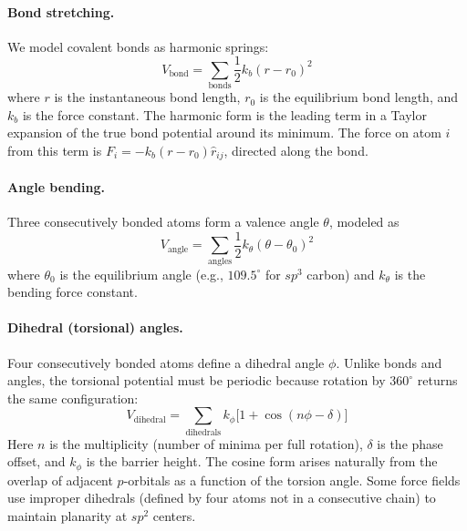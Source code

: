 \paragraph{Bond stretching.} We model covalent bonds as harmonic springs:
\begin{equation}
\label{eq:bond}
V_{\text{bond}} = \sum_{\text{bonds}} \frac{1}{2} k_b (r - r_0)^2
\end{equation}
where $r$ is the instantaneous bond length, $r_0$ is the equilibrium bond length, and $k_b$ is the force constant. The harmonic form is the leading term in a Taylor expansion of the true bond potential around its minimum. The force on atom $i$ from this term is $F_i = -k_b(r - r_0) \hat{r}_{ij}$, directed along the bond.

\paragraph{Angle bending.} Three consecutively bonded atoms form a valence angle $\theta$, modeled as
\begin{equation}
\label{eq:angle}
V_{\text{angle}} = \sum_{\text{angles}} \frac{1}{2} k_\theta (\theta - \theta_0)^2
\end{equation}
where $\theta_0$ is the equilibrium angle (e.g., $109.5^\circ$ for $sp^3$ carbon) and $k_\theta$ is the bending force constant.

\paragraph{Dihedral (torsional) angles.} Four consecutively bonded atoms define a dihedral angle $\phi$. Unlike bonds and angles, the torsional potential must be periodic because rotation by $360^\circ$ returns the same configuration:
\begin{equation}
\label{eq:dihedral}
V_{\text{dihedral}} = \sum_{\text{dihedrals}} k_\phi \bigl[1 + \cos(n\phi - \delta)\bigr]
\end{equation}
Here $n$ is the multiplicity (number of minima per full rotation), $\delta$ is the phase offset, and $k_\phi$ is the barrier height. The cosine form arises naturally from the overlap of adjacent $p$-orbitals as a function of the torsion angle. Some force fields use improper dihedrals (defined by four atoms not in a consecutive chain) to maintain planarity at $sp^2$ centers.

